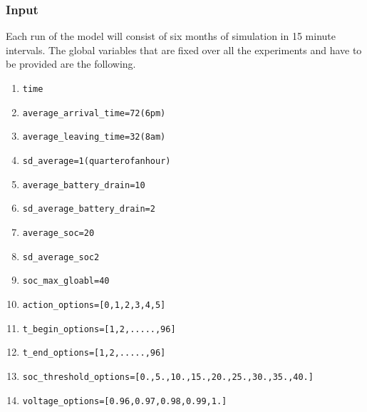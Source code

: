 \documentclass[a4paper]{article}
\begin{document}
\subsubsection{Input}
Each run of the model will consist of six months of simulation in 15 minute intervals. The global variables that are fixed
over all the experiments and have to be provided are the following. 
\begin{enumerate}
 \item \begin{alltt}time\end{alltt}
 \item \begin{alltt}average_arrival_time = 72 (6pm)\end{alltt}
 \item \begin{alltt}average_leaving_time = 32 (8am) \end{alltt}
 \item \begin{alltt}sd_average = 1 (quarter of an hour)\end{alltt}
 \item \begin{alltt}average_battery_drain = 10 \end{alltt}
 \item \begin{alltt}sd_average_battery_drain = 2\end{alltt}
 \item \begin{alltt}average_soc = 20 \end{alltt}
 \item \begin{alltt}sd_average_soc 2\end{alltt}
 \item \begin{alltt}soc_max_gloabl = 40\end{alltt}
 \item \begin{alltt}action_options = [0,1,2,3,4,5]\end{alltt}
 \item \begin{alltt}t_begin_options = [1,2,.....,96]\end{alltt}
 \item \begin{alltt}t_end_options = [1,2,.....,96]\end{alltt}
 \item \begin{alltt}soc_threshold_options = [  0.,   5.,  10.,  15.,  20.,  25.,  30.,  35.,  40.]\end{alltt}
 \item \begin{alltt}voltage_options = [ 0.96,  0.97,  0.98,  0.99,  1.  ]\end{alltt}
\end{enumerate}
\end{document}
